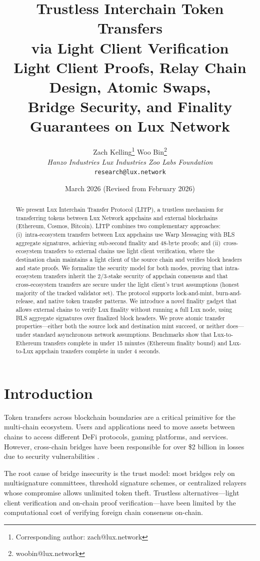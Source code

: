 \documentclass[11pt,a4paper]{article}
\title{\textbf{Trustless Interchain Token Transfers\\via Light Client Verification}\\[6pt]
\large Light Client Proofs, Relay Chain Design, Atomic Swaps,\\Bridge Security, and Finality Guarantees on Lux Network}
\author{
    Zach Kelling\thanks{Corresponding author: zach@lux.network}
    \quad
    Woo Bin\thanks{woobin@lux.network}\\
    \textit{Hanzo Industries \quad Lux Industries \quad Zoo Labs Foundation}\\
    \texttt{research@lux.network}
}
\date{March 2026 \quad (Revised from February 2026)}
\begin{document}
\maketitle

\begin{abstract}
We present Lux Interchain Transfer Protocol (LITP), a trustless mechanism for transferring tokens between Lux Network appchains and external blockchains (Ethereum, Cosmos, Bitcoin). LITP combines two complementary approaches: (i)~intra-ecosystem transfers between Lux appchains use Warp Messaging with BLS aggregate signatures, achieving sub-second finality and 48-byte proofs; and (ii)~cross-ecosystem transfers to external chains use light client verification, where the destination chain maintains a light client of the source chain and verifies block headers and state proofs. We formalize the security model for both modes, proving that intra-ecosystem transfers inherit the $2/3$-stake security of appchain consensus and that cross-ecosystem transfers are secure under the light client's trust assumptions (honest majority of the tracked validator set). The protocol supports lock-and-mint, burn-and-release, and native token transfer patterns. We introduce a novel finality gadget that allows external chains to verify Lux finality without running a full Lux node, using BLS aggregate signatures over finalized block headers. We prove atomic transfer properties---either both the source lock and destination mint succeed, or neither does---under standard asynchronous network assumptions. Benchmarks show that Lux-to-Ethereum transfers complete in under 15 minutes (Ethereum finality bound) and Lux-to-Lux appchain transfers complete in under 4 seconds.
\end{abstract}

\section{Introduction}

Token transfers across blockchain boundaries are a critical primitive for the multi-chain ecosystem. Users and applications need to move assets between chains to access different DeFi protocols, gaming platforms, and services. However, cross-chain bridges have been responsible for over \$2 billion in losses due to security vulnerabilities \cite{zamyatin2021bridge, ronin2022, wormhole2022}.

The root cause of bridge insecurity is the trust model: most bridges rely on multisignature committees, threshold signature schemes, or centralized relayers whose compromise allows unlimited token theft. Trustless alternatives---light client verification and on-chain proof verification---have been limited by the computational cost of verifying foreign chain consensus on-chain.
\end{document}

